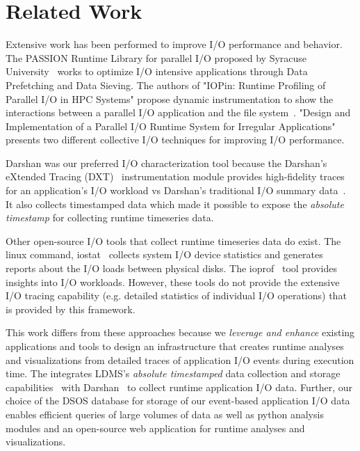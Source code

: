 \section{Related Work}
\label{sec:rw}
Extensive work has been performed to improve I/O performance and behavior. 
The PASSION Runtime Library for parallel I/O proposed by Syracuse 
University~\cite{RuntimeLibrary-ParallelI/O} works to optimize I/O intensive 
applications through Data Prefetching and Data Sieving. The authors of "IOPin: Runtime 
Profiling of Parallel I/O in HPC Systems" propose dynamic instrumentation to 
show the interactions between a parallel I/O application and the file 
system~\cite{HPC-IO-Runtime}. "Design and Implementation of a Parallel I/O 
Runtime System for Irregular Applications"~\cite{RuntimeLibrary-IrregularApps} 
presents two different collective I/O techniques for improving I/O performance. 

Darshan was our preferred I/O characterization tool because the Darshan's eXtended 
Tracing (DXT)~\cite{darshan-runtime} instrumentation module provides high-fidelity 
traces for an application's I/O workload vs Darshan's traditional I/O summary 
data~\cite{darshan-runtime}. It also collects timestamped data which made it 
possible to expose the \emph{absolute timestamp} for collecting runtime timeseries data. 

Other open-source I/O tools that collect runtime timeseries data do exist. 
The linux command, iostat~\cite{iostat} collects system I/O device statistics 
and generates reports about the I/O loads between physical disks. The ioprof~\cite{ioprof} 
tool provides insights into I/O workloads. However, these tools do not provide the 
extensive I/O tracing capability (e.g. detailed statistics of individual I/O operations) 
that is provided by this framework. 

This work differs from these approaches because we \emph{leverage and enhance} 
existing applications and tools to design an infrastructure that creates runtime 
analyses and visualizations from detailed traces of application I/O events during 
execution time. The \Darshan{} integrates LDMS's \emph{
absolute timestamped} data collection and storage capabilities~\cite{ldmsgithub} 
with Darshan~\cite{darshan-webpage} to collect runtime application I/O data. 
Further, our choice of the DSOS database for storage of our event-based application
I/O data enables efficient queries of large volumes of data as well as python 
analysis modules and an open-source web application for runtime analyses and 
visualizations.

